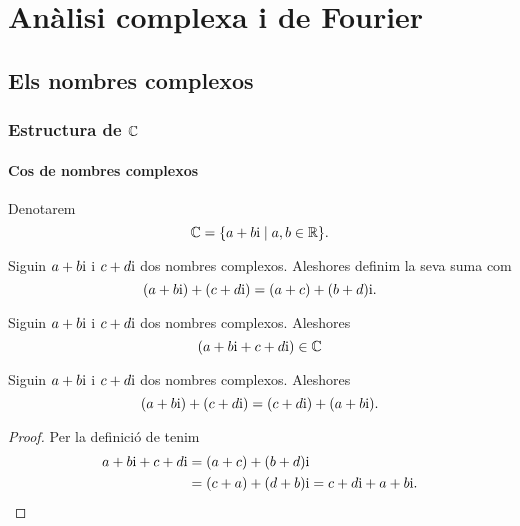 \documentclass[../Apunts.tex]{subfiles}
\begin{document}
\part{Anàlisi complexa i de Fourier}
\chapter{Els nombres complexos}
\section{Estructura de \ensuremath{\field{C}}}
	\subsection{Cos de nombres complexos}
	\begin{notation}
		\label{notation:cos de nombres complexos}
		Denotarem
		\[\mathbb{C}=\{a+b\mathrm{i}\mid a,b\in\mathbb{R}\}.\]
	\end{notation}
	\begin{definition}
		\label{def:suma de nombres complexos}
		Siguin \(a+b\mathrm{i}\) i \(c+d\mathrm{i}\) dos nombres complexos. Aleshores definim la seva suma com
		\[(a+b\mathrm{i})+(c+d\mathrm{i})=(a+c)+(b+d)\mathrm{i}.\]
	\end{definition}
	\begin{observation}
		\label{obs:els nombres complexos estan tancats per la suma}
		Siguin \(a+b\mathrm{i}\) i \(c+d\mathrm{i}\) dos nombres complexos. Aleshores
		\[(a+b\mathrm{i}+c+d\mathrm{i})\in\mathbb{C}\]
	\end{observation}
	\begin{proposition}
		\label{prop:els nombres complexos commuten per la suma}
		Siguin \(a+b\mathrm{i}\) i \(c+d\mathrm{i}\) dos nombres complexos. Aleshores
		\[(a+b\mathrm{i})+(c+d\mathrm{i})=(c+d\mathrm{i})+(a+b\mathrm{i}).\]
		\begin{proof}
			Per la definició de  tenim
			\begin{align*}
				a+b\mathrm{i}+c+d\mathrm{i}&=(a+c)+(b+d)\mathrm{i} \\
				&=(c+a)+(d+b)\mathrm{i}=c+d\mathrm{i}+a+b\mathrm{i}.\qedhere
			\end{align*}
		\end{proof}
	\end{proposition}
\end{document}
